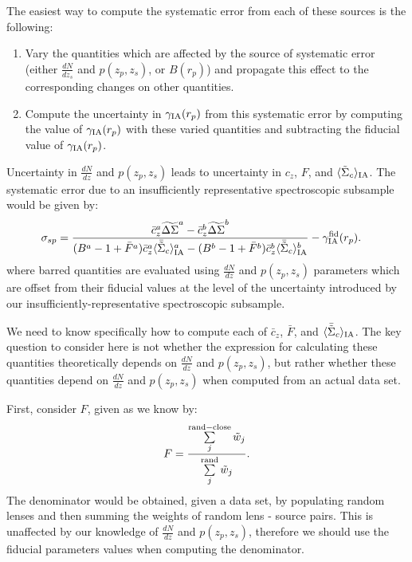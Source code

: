 \documentclass[onecolumn,amsmath,aps,fleqn, superscriptaddress]{revtex4}
\begin{document}
The easiest way to compute the systematic error from each of these sources is the following:
\begin{enumerate}
\item{Vary the quantities which are affected by the source of systematic error (either $\frac{dN}{dz_s}$ and $p(z_p, z_s)$, or $B(r_p)$) and propagate this effect to the corresponding changes on other quantities.}
\item{Compute the uncertainty in $\gamma_{\rm IA}(r_p)$ from this systematic error by computing the value of $\gamma_{\rm IA}(r_p)$ with these varied quantities and subtracting the fiducial value of $\gamma_{\rm IA}(r_p)$.}
\end{enumerate}

Uncertainty in $\frac{dN}{dz}$ and $p(z_p, z_s)$ leads to uncertainty in $c_z$, $F$, and $\langle \tilde{\Sigma}_c\rangle_{\rm IA}$. The systematic error due to an insufficiently representative spectroscopic subsample would be given by:
\begin{align}
\sigma_{sp} &= \frac{\bar{c}^a_{z} \widetilde{\Delta\Sigma}^a - \bar{c}^b_{z} \widetilde{\Delta\Sigma}^b}{(B^a-1+\bar{F}^a)\bar{c}^a_{z} \langle \bar{\tilde{\Sigma}}_c\rangle_{\rm IA}^a  -(B^b-1+\bar{F}^b)\bar{c}^b_{z} \langle \bar{\tilde{\Sigma}}_c\rangle_{\rm IA}^b} - \gamma_{\rm IA}^{\rm fid}(r_p).
\label{sigmadNpzsys}
\end{align}
where barred quantities are evaluated using $\frac{dN}{dz}$ and $p(z_p, z_s)$ parameters which are offset from their fiducial values at the level of the uncertainty introduced by our insufficiently-representative spectroscopic subsample. 

We need to know specifically how to compute each of $\bar{c}_z$,  $\bar{F}$, and $\langle \bar{\tilde{\Sigma}}_c\rangle_{\rm IA}$. The key question to consider here is not whether the expression for calculating these quantities theoretically depends on $\frac{dN}{dz}$ and $p(z_p, z_s)$, but rather whether these quantities depend on $\frac{dN}{dz}$ and $p(z_p, z_s)$ when computed from an actual data set.

First, consider $F$, given as we know by:
\begin{equation}
F= \frac{\sum\limits_{j}^{\rm rand-close}\tilde{w}_j}{\sum\limits_{j}^{\rm rand} \tilde{w}_j}.
\label{F}
\end{equation}
The denominator would be obtained, given a data set, by populating random lenses and then summing the weights of random lens - source pairs. This is unaffected by our knowledge of $\frac{dN}{dz}$ and $p(z_p, z_s)$, therefore we should use the fiducial parameters values when computing the denominator.
\end{document}
